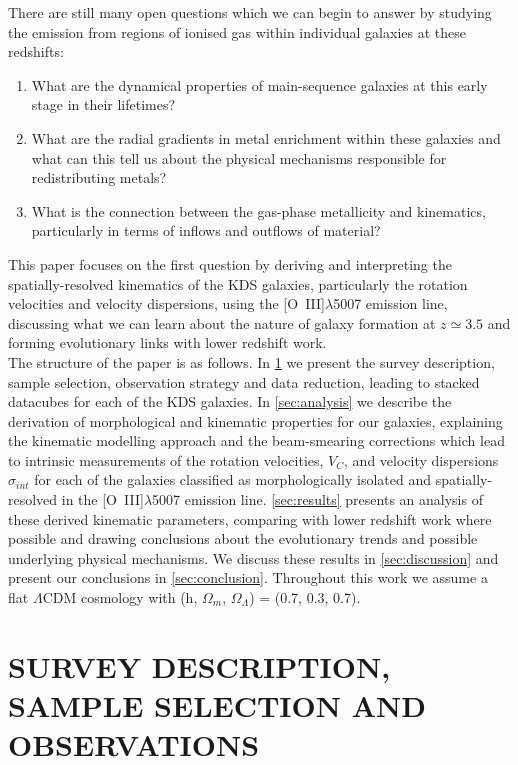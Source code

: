 \documentclass[fleqn,usenatbib]{mnras}
\begin{document}
There are still many open questions which we can begin to answer by studying the emission from regions of ionised gas within individual galaxies at these redshifts: 
\begin{enumerate}[label=(\roman*),align=left]
\item What are the dynamical properties of main-sequence galaxies at this early stage in their lifetimes?
\item  What are the radial gradients in metal enrichment within these galaxies and what can this tell us about the physical mechanisms responsible for redistributing metals?
\item What is the connection between the gas-phase metallicity and  kinematics, particularly in terms of inflows and outflows of material?
\end{enumerate}

This paper focuses on the first question by deriving and interpreting the spatially-resolved kinematics of the KDS galaxies, particularly the rotation velocities and velocity dispersions, using the [O~{\sc III}]$\lambda$5007 emission line, discussing what we can learn about the nature of galaxy formation at $z\simeq3.5$ and forming evolutionary links with lower redshift work. \\

The structure of the paper is as follows.
In \cref{sec:Survey_and_data} we present the survey description, sample selection, observation strategy and data reduction, leading to stacked datacubes for each of the KDS galaxies.
In \cref{sec:analysis} we describe the derivation of morphological and kinematic properties for our galaxies, explaining the kinematic modelling approach and the beam-smearing corrections which lead to intrinsic measurements of the rotation velocities, $V_{C}$, and velocity dispersions $\sigma_{int}$ for each of the galaxies classified as morphologically isolated and spatially-resolved in the [O~{\sc III}]$\lambda$5007 emission line.
\cref{sec:results} presents an analysis of these derived kinematic parameters, comparing with lower redshift work where possible and drawing conclusions about the evolutionary trends and possible underlying physical mechanisms.
We discuss these results in \cref{sec:discussion} and present our conclusions in \cref{sec:conclusion}.
Throughout this work we assume a flat $\Lambda$CDM cosmology with (h, $\Omega_{m}$, $\Omega_{\Lambda}$) = (0.7, 0.3, 0.7). 

\section{SURVEY DESCRIPTION, SAMPLE SELECTION AND OBSERVATIONS}\label{sec:Survey_and_data}
\end{document}
